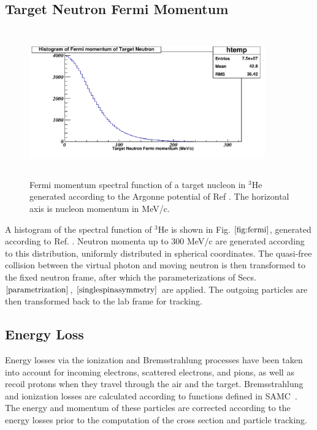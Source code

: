 \subsection{ Target Neutron Fermi Momentum 
\label{fermimotion}}

\begin{figure}[!hbt]
    \centering
    \includegraphics[width=4.0in,height=2.5in]{./figures/Fermi.pdf}
    \caption{Fermi momentum spectral function of a target nucleon in $^3$He
generated according to the Argonne potential of Ref \cite{fermipaper}.  The
horizontal axis is nucleon momentum in MeV/c.}
    \label{fig:fermi}
\end{figure}

A histogram of the spectral function of $^3$He is shown in
Fig. $\ref{fig:fermi}$, generated according to Ref.  \cite{fermipaper}. Neutron
momenta up to 300 MeV/c are generated according to this distribution, uniformly
distributed in spherical coordinates. The quasi-free collision between the
virtual photon and moving neutron is then transformed to the fixed neutron
frame, after which the parameterizations of Secs. $\ref{parametrization}$,
$\ref{singlespinasymmetry}$ are applied. The outgoing particles are then
transformed back to the lab frame for tracking.

\subsection{Energy Loss}

Energy losses via the ionization and Bremsstrahlung processes have been taken
into account for incoming electrons, scattered electrons, and pions, as well as
recoil protons when they travel through the air and the target. Bremsstrahlung
and ionization losses are calculated according to functions defined in
SAMC~\cite{samc}.  The energy and momentum of these particles are corrected
according to the energy losses prior to the computation of the cross section
and particle tracking.
